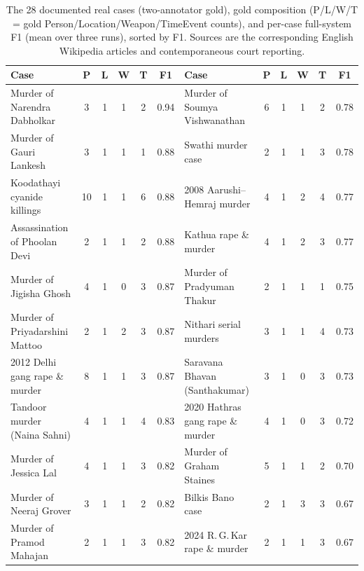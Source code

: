 \documentclass[conference]{IEEEtran}
\begin{document}
\begin{table}[t]
  \centering
  \caption{The 28 documented real cases (two-annotator gold), gold composition
  (P/L/W/T = gold Person/Location/Weapon/TimeEvent counts), and per-case
  full-system F1 (mean over three runs), sorted by F1. Sources are the
  corresponding English Wikipedia articles and contemporaneous court reporting.}
  \label{tab:cases}
  \scriptsize
  \renewcommand{\arraystretch}{0.96}
  \setlength{\tabcolsep}{4pt}
  \begin{tabular}{@{}P{3.7cm}ccccc@{\hspace{1.2cm}}P{3.7cm}ccccc@{}}
    \toprule
    \textbf{Case} & \textbf{P} & \textbf{L} & \textbf{W} & \textbf{T} & \textbf{F1} &
    \textbf{Case} & \textbf{P} & \textbf{L} & \textbf{W} & \textbf{T} & \textbf{F1} \\
    \midrule
    Murder of Narendra Dabholkar   & 3 & 1 & 1 & 2 & 0.94 & Murder of Soumya Vishwanathan   & 6 & 1 & 1 & 2 & 0.78 \\
    Murder of Gauri Lankesh        & 3 & 1 & 1 & 1 & 0.88 & Swathi murder case              & 2 & 1 & 1 & 3 & 0.78 \\
    Koodathayi cyanide killings    & 10 & 1 & 1 & 6 & 0.88 & 2008 Aarushi--Hemraj murder     & 4 & 1 & 2 & 4 & 0.77 \\
    Assassination of Phoolan Devi  & 2 & 1 & 1 & 2 & 0.88 & Kathua rape \& murder           & 4 & 1 & 2 & 3 & 0.77 \\
    Murder of Jigisha Ghosh        & 4 & 1 & 0 & 3 & 0.87 & Murder of Pradyuman Thakur      & 2 & 1 & 1 & 1 & 0.75 \\
    Murder of Priyadarshini Mattoo & 2 & 1 & 2 & 3 & 0.87 & Nithari serial murders          & 3 & 1 & 1 & 4 & 0.73 \\
    2012 Delhi gang rape \& murder & 8 & 1 & 1 & 3 & 0.87 & Saravana Bhavan (Santhakumar)   & 3 & 1 & 0 & 3 & 0.73 \\
    Tandoor murder (Naina Sahni)   & 4 & 1 & 1 & 4 & 0.83 & 2020 Hathras gang rape \& murder & 4 & 1 & 0 & 3 & 0.72 \\
    Murder of Jessica Lal          & 4 & 1 & 1 & 3 & 0.82 & Murder of Graham Staines        & 5 & 1 & 1 & 2 & 0.70 \\
    Murder of Neeraj Grover        & 3 & 1 & 1 & 2 & 0.82 & Bilkis Bano case                & 2 & 1 & 3 & 3 & 0.67 \\
    Murder of Pramod Mahajan       & 2 & 1 & 1 & 3 & 0.82 & 2024 R.\,G.\,Kar rape \& murder  & 2 & 1 & 1 & 3 & 0.67 \\

\end{tabular}
\end{table}
\end{document}
